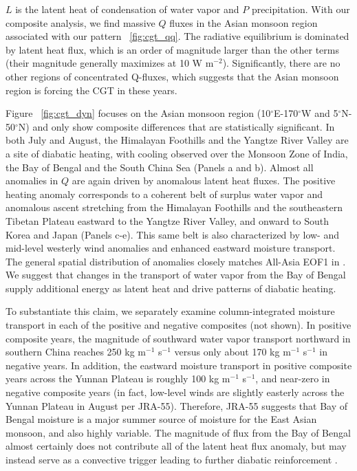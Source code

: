	$L$ is the latent heat of condensation of water vapor and $P$ precipitation. With our composite analysis, we find massive $Q$ fluxes in the Asian monsoon region associated with our pattern ~\ref{fig:cgt_qq}. The radiative equilibrium is dominated by latent heat flux, which is an order of magnitude larger than the other terms (their magnitude generally maximizes at 10 W m$^{-2}$). Significantly, there are no other regions of concentrated Q-fluxes, which suggests that the Asian monsoon region is forcing the CGT in these years.
	
	
	Figure ~\ref{fig:cgt_dyn} focuses on the Asian monsoon region (10$^{\circ}$E-170$^{\circ}$W and 5$^{\circ}$N-50$^{\circ}$N) and only show composite differences that are statistically significant. In both July and August, the Himalayan Foothills and the Yangtze River Valley are a site of diabatic heating, with cooling observed over the Monsoon Zone of India, the Bay of Bengal and the South China Sea (Panels a and b). Almost all anomalies in $Q$ are again driven by anomalous latent heat fluxes. The positive heating anomaly corresponds to a coherent belt of surplus water vapor and anomalous ascent stretching from the Himalayan Foothills and the southeastern Tibetan Plateau eastward to the Yangtze River Valley, and onward to South Korea and Japan (Panels c-e). This same belt is also characterized by low- and mid-level westerly wind anomalies and enhanced eastward moisture transport. The general spatial distribution of anomalies closely matches All-Asia EOF1 in \citet{Day2015}. We suggest that changes in the transport of water vapor from the Bay of Bengal supply additional energy as latent heat and drive patterns of diabatic heating. 
	
	To substantiate this claim, we separately examine column-integrated moisture transport in each of the positive and negative composites (not shown). In positive composite years, the magnitude of southward water vapor transport northward in southern China reaches 250 kg m$^{-1}$ s$^{-1}$ versus only about 170 kg m$^{-1}$ s$^{-1}$ in negative years. In addition, the eastward moisture transport in positive composite years across the Yunnan Plateau is roughly 100 kg m$^{-1}$ s$^{-1}$, and near-zero in negative composite years (in fact, low-level winds are slightly easterly across the Yunnan Plateau in August per JRA-55). Therefore, JRA-55 suggests that Bay of Bengal moisture is a major summer source of moisture for the East Asian monsoon, and also highly variable. The magnitude of flux from the Bay of Bengal almost certainly does not contribute all of the latent heat flux anomaly, but may instead serve as a convective trigger leading to further diabatic reinforcement \citep{Sampe2010}.
	
